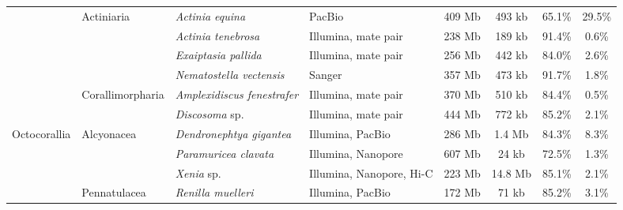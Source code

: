 \begin{table}
{\begin{tabular}{llllcccc}
    & Actiniaria & \textit{Actinia equina} \cite{actinia_equina} & PacBio & 409 Mb & 493 kb & 65.1\% & 29.5\% \\
    & & \textit{Actinia tenebrosa} \cite{actinia_tenebrosa} & Illumina, mate pair & 238 Mb & 189 kb & 91.4\% & 0.6\% \\
    & & \textit{Exaiptasia pallida} \cite{exaiptasia_pallida} & Illumina, mate pair & 256 Mb & 442 kb & 84.0\% & 2.6\% \\
    & & \textit{Nematostella vectensis} \cite{nematostella_vectensis} & Sanger & 357 Mb & 473 kb & 91.7\% & 1.8\% \\
    & Corallimorpharia & \textit{Amplexidiscus fenestrafer} \cite{amplexidiscus_fenestrafer} & Illumina, mate pair & 370 Mb & 510 kb & 84.4\% & 0.5\% \\
    & & \textit{Discosoma} sp. \cite{amplexidiscus_fenestrafer} & Illumina, mate pair & 444 Mb & 772 kb & 85.2\% & 2.1\% \\
\hline
Octocorallia & Alcyonacea & \textit{Dendronephtya gigantea} \cite{dendronephthya_gigantea} & Illumina, PacBio & 286 Mb & 1.4 Mb & 84.3\% & 8.3\% \\
    & & \textit{Paramuricea clavata} \cite{paramuricea_clavata} & Illumina, Nanopore & 607 Mb & 24 kb & 72.5\% & 1.3\% \\
    & & \textit{Xenia} sp. \cite{xenia_sp} & Illumina, Nanopore, Hi-C & 223 Mb & 14.8 Mb & 85.1\% & 2.1\% \\
    & Pennatulacea & \textit{Renilla muelleri} \cite{renilla_muelleri} & Illumina, PacBio & 172 Mb & 71 kb & 85.2\% & 3.1\% \\
\hline
\end{tabular}
}
\label{tab:anthozoans}
\end{table}